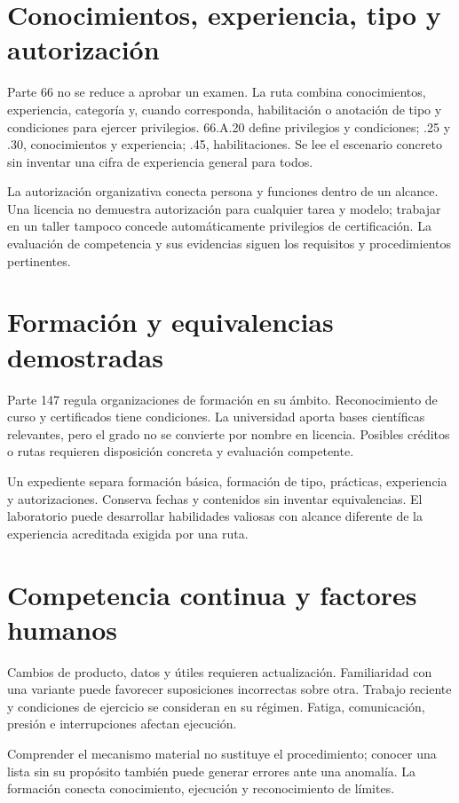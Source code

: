 
\section{Conocimientos, experiencia, tipo y autorización}
Parte 66 no se reduce a aprobar un examen. La ruta combina conocimientos, experiencia, categoría y, cuando corresponda, habilitación o anotación de tipo y condiciones para ejercer privilegios. 66.A.20 define privilegios y condiciones; .25 y .30, conocimientos y experiencia; .45, habilitaciones. Se lee el escenario concreto sin inventar una cifra de experiencia general para todos.

La autorización organizativa conecta persona y funciones dentro de un alcance. Una licencia no demuestra autorización para cualquier tarea y modelo; trabajar en un taller tampoco concede automáticamente privilegios de certificación. La evaluación de competencia y sus evidencias siguen los requisitos y procedimientos pertinentes.
\section{Formación y equivalencias demostradas}
Parte 147 regula organizaciones de formación en su ámbito. Reconocimiento de curso y certificados tiene condiciones. La universidad aporta bases científicas relevantes, pero el grado no se convierte por nombre en licencia. Posibles créditos o rutas requieren disposición concreta y evaluación competente.

Un expediente separa formación básica, formación de tipo, prácticas, experiencia y autorizaciones. Conserva fechas y contenidos sin inventar equivalencias. El laboratorio puede desarrollar habilidades valiosas con alcance diferente de la experiencia acreditada exigida por una ruta.
\section{Competencia continua y factores humanos}
Cambios de producto, datos y útiles requieren actualización. Familiaridad con una variante puede favorecer suposiciones incorrectas sobre otra. Trabajo reciente y condiciones de ejercicio se consideran en su régimen. Fatiga, comunicación, presión e interrupciones afectan ejecución.

Comprender el mecanismo material no sustituye el procedimiento; conocer una lista sin su propósito también puede generar errores ante una anomalía. La formación conecta conocimiento, ejecución y reconocimiento de límites.
